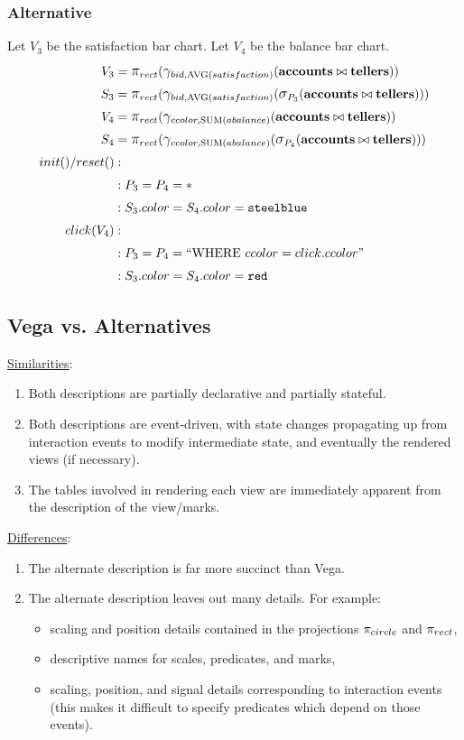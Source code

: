 \documentclass[fleqn]{sigplanconf}
\begin{document}
\subsubsection{Alternative}
Let $V_3$ be the satisfaction bar chart.
Let $V_4$ be the balance bar chart.
\begin{align*}
	V_3&= \mathlarger{\pi}_{rect}(\mathlarger{\gamma}_{bid, \text{AVG}(satisfaction)}(\bf{accounts}\bowtie{}\bf{tellers}))\\
	S_3&= \mathlarger{\pi}_{rect}(\mathlarger{\gamma}_{bid, \text{AVG}(satisfaction)}(\mathlarger{\sigma}_{P_3}(\bf{accounts}\bowtie{}\bf{tellers})))\\
	V_4&= \mathlarger{\pi}_{rect}(\mathlarger{\gamma}_{ccolor, \text{SUM}(abalance)}(\bf{accounts}\bowtie{}\bf{tellers}))\\
	S_4&= \mathlarger{\pi}_{rect}(\mathlarger{\gamma}_{ccolor, \text{SUM}(abalance)}(\mathlarger{\sigma}_{P_4}(\bf{accounts}\bowtie{}\bf{tellers})))\\
	init()/reset()&:\\
	&: P_3 = P_4 = *\\
	&: S_3.color = S_4.color = \texttt{steelblue}\\
	click(V_4)&:\\
	&: P_3 = P_4 = ``\text{WHERE}~ccolor=click.ccolor"\\
	&: S_3.color = S_4.color = \texttt{red}\\
\end{align*}
\pagebreak
\subsection{Vega vs. Alternatives}
\underline{Similarities}:
\begin{enumerate}
	\item Both descriptions are partially declarative and partially stateful.
	\item Both descriptions are event-driven, with state changes propagating up from interaction events to modify intermediate state, and eventually the rendered views (if necessary).
	\item The tables involved in rendering each view are immediately apparent from the description of the view/marks.
\end{enumerate}
\underline{Differences}:
\begin{enumerate}
	\item The alternate description is far more succinct than Vega.
	\item The alternate description leaves out many details.
		For example:
		\begin{itemize}
			\item scaling and position details contained in the projections $\mathlarger{\pi}_{circle}$ and $\mathlarger{\pi}_{rect}$,
			\item descriptive names for scales, predicates, and marks,
			\item scaling, position, and signal details corresponding to interaction events (this makes it difficult to specify predicates which depend on those events).
		\end{itemize}
\end{enumerate}
\end{document}
